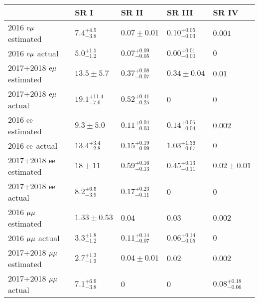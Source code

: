 \begin{table}[ht] 
\renewcommand{\arraystretch}{1.3}
\noindent \centering{}
\label{sr_closure_tests}
\begin{tabular}{lllll}
\hline
  & SR I & SR II & SR III & SR IV\\
\hline
2016 $\mathrm{e}{\mu}$ estimated       & $7.4^{+4.5}_{-3.8}$    & $0.07\pm0.01$          & $0.10^{+0.05}_{-0.03}$ & $0.001$\\
2016 $\mathrm{e}{\mu}$ actual          & $5.0^{+1.5}_{-1.2}$    & $0.07^{+0.09}_{-0.05}$ & $0.00^{+0.01}_{-0.00}$ & $0$\\
2017+2018 $\mathrm{e}{\mu}$ estimated  & $13.5\pm5.7$           & $0.37^{+0.08}_{-0.07}$ & $0.34\pm0.04$          & $0.01$\\
2017+2018 $\mathrm{e}{\mu}$ actual     & $19.1^{+11.4}_{-7.6}$  & $0.52^{+0.41}_{-0.25}$ & $0$                    & $0$\\
2016 $\mathrm{e}\mathrm{e}$ estimated        & $9.3\pm5.0$            & $0.11^{+0.04}_{-0.03}$ & $0.14^{+0.05}_{-0.04}$ & $0.002$\\
2016 $\mathrm{e}\mathrm{e}$ actual           & $13.4^{+3.4}_{-2.8}$   & $0.15^{+0.19}_{-0.09}$ & $1.03^{+1.36}_{-0.67}$ & $0$\\
2017+2018 $\mathrm{e}\mathrm{e}$ estimated   & $18\pm11$              & $0.59^{+0.16}_{-0.13}$ & $0.45^{+0.13}_{-0.11}$ & $0.02\pm0.01$\\
2017+2018 $\mathrm{e}\mathrm{e}$ actual      & $8.2^{+6.5}_{-3.9}$    & $0.17^{+0.23}_{-0.11}$ & $0$                    & $0$\\
2016 ${\mu}{\mu}$ estimated      & $1.33\pm0.53$          & $0.04$                 & $0.03$                 & $0.002$\\
2016 ${\mu}{\mu}$ actual         & $3.3^{+1.8}_{-1.2}$    & $0.11^{+0.14}_{-0.07}$ & $0.06^{+0.14}_{-0.05}$ & $0$\\
2017+2018 ${\mu}{\mu}$ estimated & $2.7^{+1.3}_{-1.2}$    & $0.04\pm0.01$          & $0.02$                 & $0.002$\\
2017+2018 ${\mu}{\mu}$ actual    & $7.1^{+6.9}_{-3.8}$    & $0$                    & $0$                    & $0.08^{+0.18}_{-0.06}$\\
\hline
\end{tabular}
\end{table}